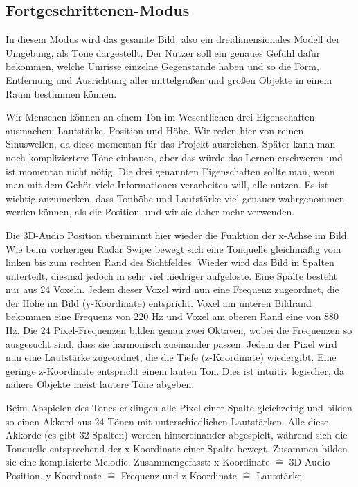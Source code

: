 \documentclass[a4paper,12pt,ngerman]{scrartcl}
\begin{document}
\subsection{Fortgeschrittenen-Modus}

In diesem Modus wird das gesamte Bild, also ein dreidimensionales Modell der Umgebung, als Töne dargestellt. 
Der Nutzer soll ein genaues Gefühl dafür bekommen, welche Umrisse einzelne Gegenstände haben und so die Form, Entfernung und Ausrichtung aller mittelgroßen und großen Objekte in einem Raum bestimmen können. \par 
Wir Menschen können an einem Ton im Wesentlichen drei
Eigenschaften ausmachen: Lautstärke, Position und Höhe. Wir reden hier von reinen Sinuswellen, da diese momentan für 
das Projekt ausreichen. Später kann man noch kompliziertere Töne einbauen, aber das würde das Lernen erschweren
und ist momentan nicht nötig. Die drei genannten Eigenschaften sollte man, wenn man mit dem Gehör viele Informationen
verarbeiten will, alle nutzen. Es ist wichtig anzumerken, dass Tonhöhe und Lautstärke viel genauer wahrgenommen werden
können, als die Position, und wir sie daher mehr verwenden. \par 
Die 3D-Audio Position übernimmt hier wieder die Funktion der x-Achse im Bild. Wie beim vorherigen Radar Swipe bewegt
sich eine Tonquelle gleichmäßig vom linken bis zum rechten Rand des Sichtfeldes. Wieder wird das Bild in Spalten 
unterteilt, diesmal jedoch in sehr viel niedriger aufgelöste. Eine Spalte besteht nur aus 24 Voxeln.
Jedem dieser Voxel wird nun eine Frequenz zugeordnet, die der Höhe im Bild (y-Koordinate) entspricht.
Voxel am unteren Bildrand bekommen eine Frequenz von 220 Hz und Voxel am oberen Rand eine von 880 Hz. Die 24 
Pixel-Frequenzen bilden genau zwei Oktaven, wobei die Frequenzen so ausgesucht sind, dass sie harmonisch zueinander
passen. Jedem der Pixel wird nun eine Lautstärke zugeordnet, die die Tiefe (z-Koordinate) wiedergibt. Eine geringe
z-Koordinate entspricht einem lauten Ton. Dies ist intuitiv logischer, da nähere Objekte meist lautere Töne abgeben.
\par 
Beim Abspielen des Tones erklingen alle Pixel einer Spalte gleichzeitig und bilden so einen Akkord aus 24 Tönen 
mit unterschiedlichen Lautstärken. Alle diese Akkorde (es gibt 32 Spalten) werden hintereinander abgespielt, während
sich die Tonquelle entsprechend der x-Koordinate einer Spalte bewegt. Zusammen bilden sie eine komplizierte Melodie.
Zusammengefasst: x-Koordinate $\hat{=}$ 3D-Audio Position, y-Koordinate $\hat{=}$ Frequenz und z-Koordinate $\hat{=}$ Lautstärke.
\end{document}
